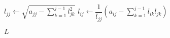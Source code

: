 \documentclass[varwidth]{standalone}
\begin{document}
\begin{algorithmic}[1]

	\State $l_{jj} \gets \sqrt{a_{jj} - \displaystyle\sum_{k=1}^{j-1} l_{jk}^2}$
		\State $l_{ij} \gets \dfrac{1}{l_{jj}} \left(a_{ij} - \displaystyle\sum_{k=1}^{j-1} l_{ik}l_{jk} \right)$
	\EndFor
\EndFor

\State \Return $L$

\EndFunction
\end{algorithmic}
\end{document}
